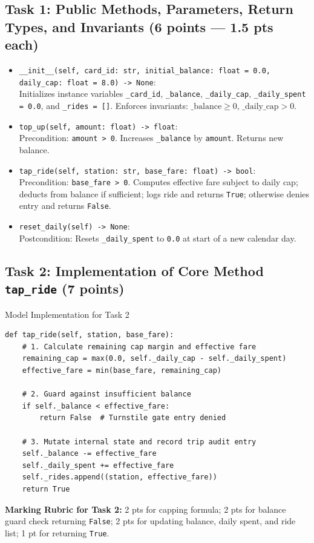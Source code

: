 \documentclass[11pt,a4paper]{article}
\begin{document}
\subsection*{Task 1: Public Methods, Parameters, Return Types, and Invariants (6 points --- 1.5 pts each)}
\begin{itemize}[itemsep=2pt]
\item \texttt{\_\_init\_\_(self, card\_id: str, initial\_balance: float = 0.0, daily\_cap: float = 8.0) -> None}:\\
  Initializes instance variables \texttt{\_card\_id}, \texttt{\_balance}, \texttt{\_daily\_cap}, \texttt{\_daily\_spent = 0.0}, and \texttt{\_rides = []}. Enforces invariants: $\text{\_balance} \ge 0$, $\text{\_daily\_cap} > 0$.
\item \texttt{top\_up(self, amount: float) -> float}:\\
  Precondition: \texttt{amount > 0}. Increases \texttt{\_balance} by \texttt{amount}. Returns new balance.
\item \texttt{tap\_ride(self, station: str, base\_fare: float) -> bool}:\\
  Precondition: \texttt{base\_fare > 0}. Computes effective fare subject to daily cap; deducts from balance if sufficient; logs ride and returns \texttt{True}; otherwise denies entry and returns \texttt{False}.
\item \texttt{reset\_daily(self) -> None}:\\
  Postcondition: Resets \texttt{\_daily\_spent} to \texttt{0.0} at start of a new calendar day.
\end{itemize}

\subsection*{Task 2: Implementation of Core Method \texttt{tap\_ride} (7 points)}
\begin{solbox}{Model Implementation for Task 2}
\begin{lstlisting}
def tap_ride(self, station, base_fare):
    # 1. Calculate remaining cap margin and effective fare
    remaining_cap = max(0.0, self._daily_cap - self._daily_spent)
    effective_fare = min(base_fare, remaining_cap)
    
    # 2. Guard against insufficient balance
    if self._balance < effective_fare:
        return False  # Turnstile gate entry denied
    
    # 3. Mutate internal state and record trip audit entry
    self._balance -= effective_fare
    self._daily_spent += effective_fare
    self._rides.append((station, effective_fare))
    return True
\end{lstlisting}
\end{solbox}
\textbf{Marking Rubric for Task 2:} 2 pts for capping formula; 2 pts for balance guard check returning \texttt{False}; 2 pts for updating balance, daily spent, and ride list; 1 pt for returning \texttt{True}.
\end{document}
